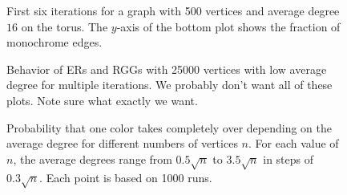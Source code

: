 \documentclass[a4paper,UKenglish,cleveref, autoref, thm-restate]{lipics-v2021}
\begin{document}
\begin{figure}
  
  \caption{First six iterations for a graph with \num{500} vertices
    and average degree $16$ on the torus.  The $y$-axis of the bottom
    plot shows the fraction of monochrome edges.}
\end{figure}

\begin{figure}
  \centering
  \small
  
  \caption{Behavior of ERs and RGGs with \num{25000} vertices with low
    average degree for multiple iterations.  We probably don't want
    all of these plots.  Note sure what exactly we want.}
\end{figure}

\begin{figure}
  \centering
  \small
  
  \caption{Probability that one color takes completely over depending
    on the average degree for different numbers of vertices $n$.  For
    each value of $n$, the average degrees range from $0.5\sqrt{n}$ to
    $3.5\sqrt{n}$ in steps of $0.3\sqrt{n}$.  Each point is based on
    \num{1000} runs.}
\end{figure}
\end{document}
